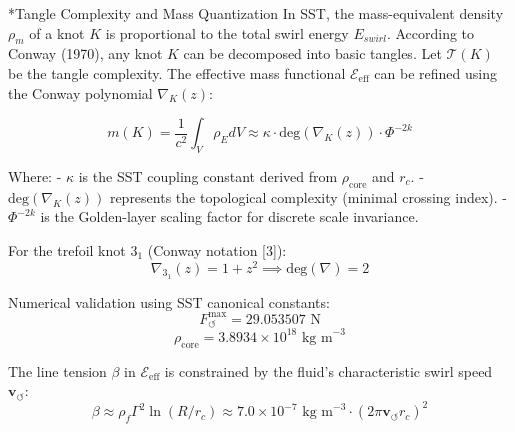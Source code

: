 \documentclass[11pt]{article}
\begin{document}
            \begin{section}*{Tangle Complexity and Mass Quantization}
                In SST, the mass-equivalent density $\rho_m$ of a knot $K$ is proportional to the total swirl energy $E_{swirl}$.
                According to Conway (1970), any knot $K$ can be decomposed into basic tangles. Let $\mathcal{T}(K)$ be the tangle complexity.
                The effective mass functional $\mathcal{E}_{\text{eff}}$ can be refined using the Conway polynomial $\nabla_K(z)$:

                \begin{equation}
                    m(K) = \frac{1}{c^2} \int_{V} \rho_E dV \approx \kappa \cdot \text{deg}(\nabla_K(z)) \cdot \Phi^{-2k}
                \end{equation}

                Where:
                - $\kappa$ is the SST coupling constant derived from $\rho_{\text{core}}$ and $r_c$.
                - $\text{deg}(\nabla_K(z))$ represents the topological complexity (minimal crossing index).
                - $\Phi^{-2k}$ is the Golden-layer scaling factor for discrete scale invariance.

                For the trefoil knot $3_1$ (Conway notation [3]):
                \begin{equation}
                    \nabla_{3_1}(z) = 1 + z^2 \implies \text{deg}(\nabla) = 2
                \end{equation}

                Numerical validation using SST canonical constants:
                \begin{equation}
                    F_{\!\boldsymbol{\circlearrowleft}}^{\max} = 29.053507 \text{ N}
                \end{equation}
                \begin{equation}
                    \rho_{\text{core}} = 3.8934 \times 10^{18} \text{ kg m}^{-3}
                \end{equation}

                The line tension $\beta$ in $\mathcal{E}_{\text{eff}}$ is constrained by the fluid's characteristic swirl speed $\mathbf{v}_{\!\boldsymbol{\circlearrowleft}}$:
                \begin{equation}
                    \beta \approx \rho_{\!f} \Gamma^2 \ln(R/r_c) \approx 7.0 \times 10^{-7} \text{ kg m}^{-3} \cdot (2\pi \mathbf{v}_{\!\boldsymbol{\circlearrowleft}} r_c)^2
                \end{equation}
            \end{section}
\end{document}
